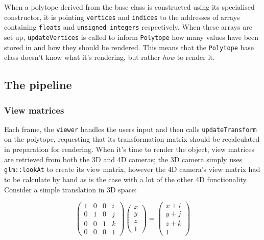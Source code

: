 \documentclass[11pt, a4paper]{article}
\begin{document}
When a polytope derived from the base class is constructed using its specialised constructor, it is pointing \texttt{vertices} and \texttt{indices} to the addresses of arrays containing \texttt{floats} and \texttt{unsigned integers} respectively. When these arrays are set up, \texttt{updateVertices} is called to inform \texttt{Polytope} how many values have been stored in and how they should be rendered. This means that the \texttt{Polytope} base class doesn't know what it's rendering, but rather \emph{how} to render it.

\subsection{The pipeline}
\subsubsection{View matrices}
\label{subsubsec:viewMatrices}

Each frame, the \texttt{viewer} handles the users input and then calls \texttt{updateTransform} on the polytope, requesting that its transformation matrix should be recalculated in preparation for rendering. When it's time to render the object, view matrices are retrieved from both the 3D and 4D cameras; the 3D camera simply uses \texttt{glm::lookAt} to create its view matrix, however the 4D camera's view matrix had to be calculate by hand as is the case with a lot of the other 4D functionality. Consider a simple translation in 3D space:

\begin{equation*}
  \begin{pmatrix}
  1 & 0 & 0 & i \\
  0 & 1 & 0 & j \\
  0 & 0 & 1 & k \\
  0 & 0 & 0 & 1
  \end{pmatrix}
  \begin{pmatrix}
    x \\
    y \\
    z \\
    1
  \end{pmatrix}
  =
  \begin{pmatrix}
    x + i \\
    y + j \\
    z + k \\
    1
  \end{pmatrix}
\end{equation*}
\end{document}
